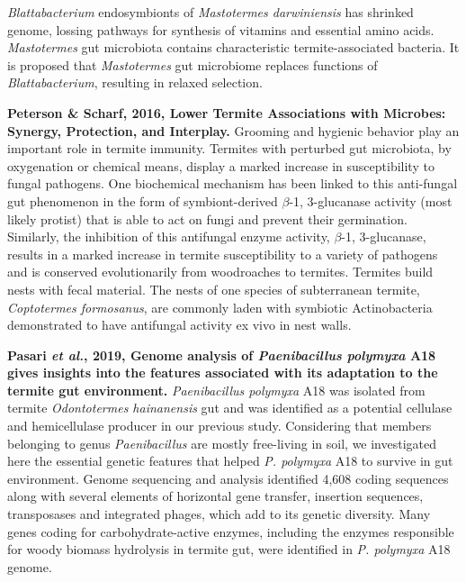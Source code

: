 \documentclass[11pt]{article}
\begin{document}
\begin{sloppypar}
\textit{Blattabacterium} endosymbionts of \textit{Mastotermes darwiniensis} has shrinked genome, lossing pathways for synthesis of vitamins and essential amino acids. 
\textit{Mastotermes} gut microbiota contains characteristic termite-associated bacteria.
It is proposed that \textit{Mastotermes} gut microbiome replaces functions of \textit{Blattabacterium}, resulting in relaxed selection.
\par
\textbf{Peterson & Scharf, 2016, Lower Termite Associations with Microbes: Synergy, Protection, and Interplay.} \newline
Grooming and hygienic behavior play an important role in termite immunity. 
Termites with perturbed gut microbiota, by oxygenation or chemical means, display a marked increase in susceptibility to fungal pathogens. 
One biochemical mechanism has been linked to this anti-fungal gut phenomenon in the form of symbiont-derived $\beta$-1, 3-glucanase activity (most likely protist) that is able to act on fungi and prevent their germination. 
Similarly, the inhibition of this antifungal enzyme activity, $\beta$-1, 3-glucanase, results in a marked increase in termite susceptibility to a variety of pathogens and is conserved evolutionarily from woodroaches to termites. 
Termites build nests with fecal material. 
The nests of one species of subterranean termite, \textit{Coptotermes formosanus}, are commonly laden with symbiotic Actinobacteria demonstrated to have antifungal activity ex vivo in nest walls.
\par
\textbf{Pasari \textit{et al.}, 2019, Genome analysis of \textit{Paenibacillus polymyxa} A18 gives insights into the features associated with its adaptation to the termite gut environment.} \newline
\textit{Paenibacillus polymyxa} A18 was isolated from termite \textit{Odontotermes hainanensis} gut and was identified as a potential cellulase and hemicellulase producer in our previous study. 
Considering that members belonging to genus \textit{Paenibacillus} are mostly free-living in soil, we investigated here the essential genetic features that helped \textit{P. polymyxa} A18 to survive in gut environment. 
Genome sequencing and analysis identified 4,608 coding sequences along with several elements of horizontal gene transfer, insertion sequences, transposases and integrated phages, which add to its genetic diversity. 
Many genes coding for carbohydrate-active enzymes, including the enzymes responsible for woody biomass hydrolysis in termite gut, were identified in \textit{P. polymyxa} A18 genome. 

\end{sloppypar}
\end{document}
